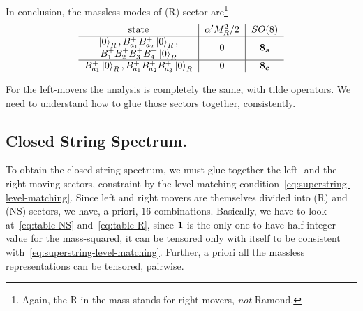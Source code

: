 In conclusion, the massless modes of (R) sector are\footnote{Again, the R in the mass stands for right-movers, \emph{not} Ramond.}
\begin{equation}\label{eq:table-R}
    \begin{tabular}{c|c|c}
        state & $\alpha' M^2_R / 2$ & $SO(8)$ \\ \hline
        \multirow{2}{*}{$\begin{array}{c} 
            \ket{0}_{R}, B^+_{a_1}B^+_{a_2}\ket{0}_{R}, \\ 
            B^+_{1}B^+_{2}B^+_{3}B^+_{4} \ket{0}_{R} 
        \end{array}$} & \multirow{2}{*}{$0$} & \multirow{2}{*}{$\s$} \\ 
        & & \\ \hline
        $B^+_{a_1} \ket{0}_{R}, B^+_{a_1}B^+_{a_2}B^+_{a_3}\ket{0}_{R}$   & $0$   & $\c$
    \end{tabular}
\end{equation}

For the left-movers the analysis is completely the same, with tilde operators. We need to understand how to glue those sectors together, consistently.

\subsection{Closed String Spectrum.}
To obtain the closed string spectrum, we must glue together the left- and the right-moving sectors, constraint by the level-matching condition~\eqref{eq:superstring-level-matching}. Since left and right movers are themselves divided into (R) and (NS) sectors, we have, a priori, $16$ combinations. Basically, we have to look at~\eqref{eq:table-NS} and~\eqref{eq:table-R}, since $\boldsymbol{1}$ is the only one to have half-integer value for the mass-squared, it can be tensored only with itself to be consistent with~\eqref{eq:superstring-level-matching}. Further, a priori all the massless representations can be tensored, pairwise.

